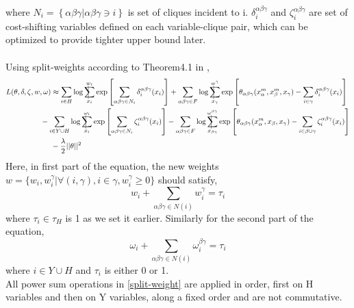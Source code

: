 \documentclass{article}
\makeatletter
\newcommand{\avsum}{\mathop{\mathpalette\avsuminner\relax}\displaylimits}
\newcommand\avsuminner[2]{%
  {\sbox0{$\m@th#1\sum$}%
   \vphantom{\usebox0}%
   \ooalign{%
     \hidewidth
     \smash{\vrule height\dimexpr\ht0+1pt\relax depth\dimexpr\dp0+1pt\relax}%
     \hidewidth\cr
     $\m@th#1\sum$\cr
   }%
  }%
}
\makeatother
\begin{document}
where $N_i=\left\{ \alpha\beta\gamma | \alpha\beta\gamma \ni i \right\}$ is set of cliques incident to i. $\delta_i^{\alpha\beta\gamma}$ and $\zeta_i^{\alpha\beta\gamma}$ are set of cost-shifting variables defined on each variable-clique pair, which can be optimized to provide tighter upper bound later.\\\\
Using split-weights according to Theorem4.1 in \cite{Ping2015},
\begin{align}
 L(\theta,\delta,\zeta,w,\omega)&\approx \sum_{i\in H}\log\avsum_{x_i}^{w_i}\exp\left [ \sum_{\alpha\beta\gamma \in N_i} \delta_i^{\alpha\beta\gamma}(x_i)\right ] + \sum_{\alpha\beta\gamma \in F}\log\avsum_{x_{\gamma}}^{w^{\gamma}}\exp\left [\theta_{\alpha\beta\gamma}(x_{\alpha}^m,x_{\beta}^m,x_{\gamma})-\sum_{i\in \gamma}\delta_i^{\alpha\beta\gamma}(x_i) \right ] \nonumber \\ &\hspace{-5mm}- \sum_{i\in Y\cup H}\log\avsum_{x_i}^{\omega_i}\exp\left [ \sum_{\alpha\beta\gamma \in N_i} \zeta_i^{\alpha\beta\gamma}(x_i)\right ] - \sum_{\alpha\beta\gamma \in F}\log\avsum_{x_{\beta\gamma}}^{\omega^{\beta\gamma}}\exp\left [\theta_{\alpha\beta\gamma}(x_{\alpha}^m,x_{\beta},x_{\gamma})-\sum_{i\in \beta\cup \gamma}\zeta_i^{\alpha\beta\gamma}(x_i) \right ]\nonumber \\ \label{split-weight}&- \frac{\lambda}{2}||\theta||^2
\end{align}
Here, in first part of the equation, the new weights $w=\{w_i,w_i^{\gamma}|\forall(i,\gamma),i\in\gamma, w_i^{\gamma}\geq0\}$ should satisfy,
\begin{equation*}
w_i+\sum_{\alpha\beta\gamma\in N(i)}w_i^{\gamma}=\tau_i
\end{equation*}
where $\tau_i\in \tau_H$ is 1 as we set it earlier. Similarly for the second part of the equation,
\begin{equation*}
\omega_i+\sum_{\alpha\beta\gamma\in N(i)}\omega_i^{\beta\gamma}=\tau_i
\end{equation*}
where $i\in Y\cup H$ and $\tau_i$ is either 0 or 1.\\
All power sum operations in \ref{split-weight} are applied in order, first on H variables and then on Y variables, along a fixed order and are not commutative.\\
\end{document}
